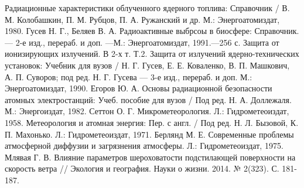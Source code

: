 \begin{thebibliography}{9}
	 Радиационные характеристики облученного ядерного топлива: Справочник / В. М. Колобашкин, П. М. Рубцов, П. А. Ружанский и др. М.: Энергоатомиздат, 1980.
	 Гусев Н. Г., Беляев В. А. Радиоактивные выбрсоы в биосфере: Справочник. --- 2-е изд., перераб. и доп.
	---М.: Энергоатомиздат, 1991.---256 с.
	 Защита от ионизирующих излучений. В 2-х т. Т.2. Защита от излучений ядерно-технических установок: Учебник для вузов / Н. Г. Гусев, Е. Е. Коваленко, В. П. Машкович, А. П. Суворов; под ред. Н. Г. Гусева --- 3-е изд., перераб. и доп. М.: Энергоатомиздат, 1990.
	 Егоров Ю. А. Основы радиационной безопасности атомных электростанций: Учеб. пособие для вузов / Под ред. Н. А. Доллежаля. М.: Энергоиздат, 1982.
	 Сеттон О. Г. Микрометеорология. Л.: Гидрометеоиздат, 1958.
	 Метеорология и атомная энергия: Пер. с англ. / Под ред. Н. Л. Бызовой, К. П. Махонько. Л.: Гидрометеоиздат, 1971.
	 Берлянд М. Е. Современные проблемы атмосферной диффузии и загрязнения атмосферы. Л.: Гидрометеоиздат, 1975.
	 Млявая Г. В. Влияние параметров шероховатости подстилающей поверхности на скорость ветра // Экология и география. Науки о жизни. 2014. № 2(323). С. 181-187.
\end{thebibliography}